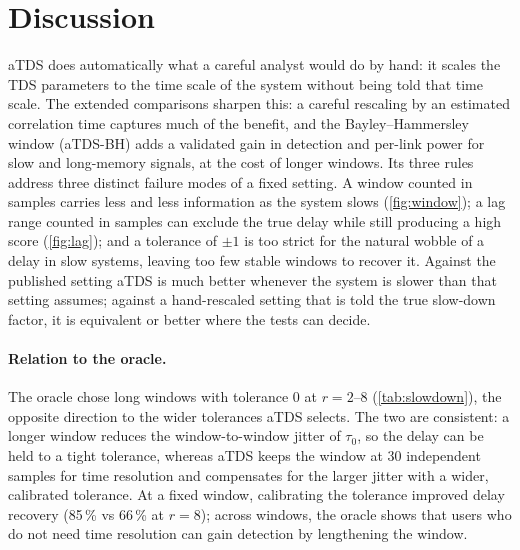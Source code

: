 \documentclass[11pt,a4paper]{article}
\begin{document}
\section{Discussion}
\label{sec:discussion}
aTDS does automatically what a careful analyst would do by hand: it scales the TDS parameters to the time scale of the system without being told that time scale. The extended comparisons sharpen this: a careful rescaling by an estimated correlation time captures much of the benefit, and the Bayley--Hammersley window (aTDS-BH) adds a validated gain in detection and per-link power for slow and long-memory signals, at the cost of longer windows. Its three rules address three distinct failure modes of a fixed setting. A window counted in samples carries less and less information as the system slows (\cref{fig:window}); a lag range counted in samples can exclude the true delay while still producing a high score (\cref{fig:lag}); and a tolerance of $\pm1$ is too strict for the natural wobble of a delay in slow systems, leaving too few stable windows to recover it. Against the published setting aTDS is much better whenever the system is slower than that setting assumes; against a hand-rescaled setting that is told the true slow-down factor, it is equivalent or better where the tests can decide.

\paragraph{Relation to the oracle.} The oracle chose long windows with tolerance 0 at $r = 2$--8 (\cref{tab:slowdown}), the opposite direction to the wider tolerances aTDS selects. The two are consistent: a longer window reduces the window-to-window jitter of $\tau_0$, so the delay can be held to a tight tolerance, whereas aTDS keeps the window at 30 independent samples for time resolution and compensates for the larger jitter with a wider, calibrated tolerance. At a fixed window, calibrating the tolerance improved delay recovery (85\,\% vs 66\,\% at $r = 8$); across windows, the oracle shows that users who do not need time resolution can gain detection by lengthening the window.
\end{document}
